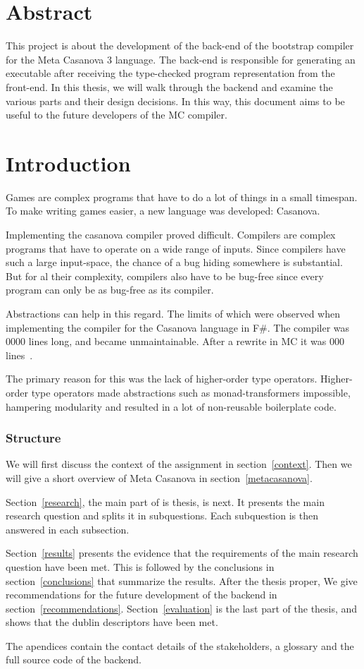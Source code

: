 \section*{Abstract}
This project is about the development of the back-end of the bootstrap compiler for the Meta Casanova 3 language.
The back-end is responsible for generating an executable after receiving the type-checked program representation from the front-end.
In this thesis, we will walk through the backend and examine the various parts and their design decisions.
In this way, this document aims to be useful to the future developers of the MC compiler.

\section{Introduction}
Games are complex programs that have to do a lot of things in a small timespan.
To make writing games easier, a new language was developed: Casanova.

Implementing the casanova compiler proved difficult.
Compilers are complex programs that have to operate on a wide range of inputs.
Since compilers have such a large input-space, the chance of a bug hiding somewhere is substantial. 
But for al their complexity, compilers also have to be bug-free since every program can only be as bug-free as its compiler.

Abstractions can help in this regard.
The limits of which were observed when implementing the compiler for the Casanova language in F\#.
The compiler was 0000 lines long, and became unmaintainable.
After a rewrite in MC it was 000 lines~\cite{maggiore}.

The primary reason for this was the lack of higher-order type operators.
Higher-order type operators made abstractions such as monad-transformers impossible, hampering modularity and resulted in a lot of non-reusable boilerplate code.

\subsubsection{Structure}
We will first discuss the context of the assignment in section~\ref{context}.
Then we will give a short overview of Meta Casanova in section~\ref{metacasanova}.

Section~\ref{research}, the main part of is thesis, is next.
It presents the main research question and splits it in subquestions.
Each subquestion is then answered in each subsection.

Section~\ref{results} presents the evidence that the requirements of the main research question have been met.
This is followed by the conclusions in section~\ref{conclusions} that summarize the results.
After the thesis proper, We give recommendations for the future development of the backend in section~\ref{recommendations}.
Section~\ref{evaluation} is the last part of the thesis, and shows that the dublin descriptors have been met.

The apendices contain the contact details of the stakeholders, a glossary and the full source code of the backend.
